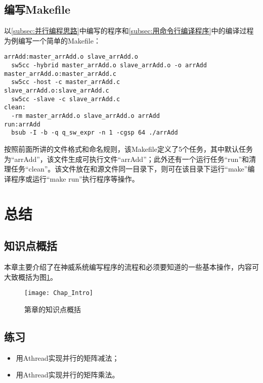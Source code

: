 \subsection{编写Makefile}\label{subsec:编写Makefile}
以\ref{subsec:并行编程思路}中编写的程序和\ref{subsec:用命令行编译程序}中的编译过程为例编写一个简单的Makefile：
\begin{lstlisting}
arrAdd:master_arrAdd.o slave_arrAdd.o
  sw5cc -hybrid master_arrAdd.o slave_arrAdd.o -o arrAdd
master_arrAdd.o:master_arrAdd.c
  sw5cc -host -c master_arrAdd.c
slave_arrAdd.o:slave_arrAdd.c
  sw5cc -slave -c slave_arrAdd.c
clean:
  -rm master_arrAdd.o slave_arrAdd.o arrAdd
run:arrAdd
  bsub -I -b -q q_sw_expr -n 1 -cgsp 64 ./arrAdd
\end{lstlisting}

按照前面所讲的文件格式和命名规则，该Makefile定义了5个任务，其中默认任务为“arrAdd”，该文件生成可执行文件“arrAdd”；此外还有一个运行任务“run”和清理任务“clean”。该文件放在和源文件同一目录下，则可在该目录下运行“make”编译程序或运行“make run”执行程序等操作。

\section{总结}
\subsection{知识点概括}
本章主要介绍了在神威系统编写程序的流程和必须要知道的一些基本操作，内容可大致概括为图\ref{fig:Chap_Intro}。

\begin{figure}[!htbp]
  \centering
  \texttt{[image: Chap\_Intro]}
  \caption{第\thechapter{}章的知识点概括}
  \label{fig:Chap_Intro}
\end{figure}

\subsection{练习}
\begin{itemize}
  \item 用Athread实现并行的矩阵减法；
  \item 用Athread实现并行的矩阵乘法。
\end{itemize}